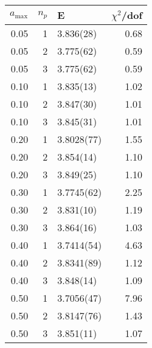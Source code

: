 \begin{tabular}{rrlr}
\hline
   $a_\textrm{max}$ &   $n_p$ & E          &   $\chi^2$/dof \\
\hline
               0.05 &       1 & 3.836(28)  &           0.68 \\
               0.05 &       2 & 3.775(62)  &           0.59 \\
               0.05 &       3 & 3.775(62)  &           0.59 \\
               0.10 &       1 & 3.835(13)  &           1.02 \\
               0.10 &       2 & 3.847(30)  &           1.01 \\
               0.10 &       3 & 3.845(31)  &           1.01 \\
               0.20 &       1 & 3.8028(77) &           1.55 \\
               0.20 &       2 & 3.854(14)  &           1.10 \\
               0.20 &       3 & 3.849(25)  &           1.10 \\
               0.30 &       1 & 3.7745(62) &           2.25 \\
               0.30 &       2 & 3.831(10)  &           1.19 \\
               0.30 &       3 & 3.864(16)  &           1.03 \\
               0.40 &       1 & 3.7414(54) &           4.63 \\
               0.40 &       2 & 3.8341(89) &           1.12 \\
               0.40 &       3 & 3.848(14)  &           1.09 \\
               0.50 &       1 & 3.7056(47) &           7.96 \\
               0.50 &       2 & 3.8147(76) &           1.43 \\
               0.50 &       3 & 3.851(11)  &           1.07 \\
\hline
\end{tabular}
